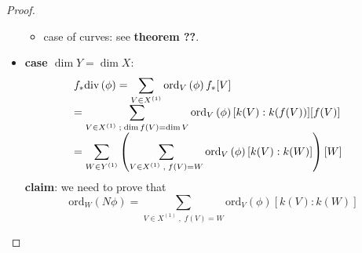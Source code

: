 \documentclass[oneside,a4paper,11pt]{amsbook}
\theoremstyle{pl}
\theoremstyle{df}
\theoremstyle{rm}
\newcommand{\pa}[1]{
\left(#1\right)
}
\newcommand{\ga}[1]{
\left\{#1\right\}
}
\newcommand{\mc}[1]{
\mathcal{#1}
}
\newcommand{\mb}[1]{
\mathbb{#1}
}
\newcommand{\spc}[1]{
\text{Spec }#1
}
\newcommand{\ord}[2]{
\text{ord}_{#1}\pa{#2}
}
\newcommand{\dv}[1]{
\text{div}\pa{#1}
}
\begin{document}
\begin{proof}
\begin{itemize}
{\begin{itemize}
{\[{}
\]
since properness is stable under base change the morph $C\rightarrow\spc k(Y)$ is \emph{proper}, $C=f^{-1}\eta\subseteq X$ (closed emb.) where $\eta\in Y$ is the generic pt. $\dim C=1$ using the \textbf{theorem of the fiber} ($\mc{O}_{Y,\eta}\rightarrow\mc{O}_{X,p}$ is flat for every $p\in f^{-1}\eta$ since everything is flat over a field, \emph{generic flatness})
\[
\dim\mc{O}_{f^{-1}\eta,p}=\dim\mc{O}_{X,p}-\dim\mc{O}_{Y,\eta}=\dim\mc{O}_{X,p}
\]
$C$ is integral: $\eta\in V\subseteq Y$ open affine subset $V=\spc B$, $k(Y)=k(B)=S^{-1}B$ where $S=B-\ga{0}$, $U\subseteq X$ open affine subset $U=\spc A$ with $A$ domain f.g. over $B$, $f^{-1}\eta\cap U=\spc A\otimes_B k(B)=\spc S^{-1}A$, $S^{-1}A$ is a domain.\\
In conclusion $C$ is a proper integral $k(Y)-$curve (possibly singular).
\[
\begin{array}{l l}
\displaystyle f_*\dv{\phi}=f_*\pa{\sum_{V\in X^{(1)}}{\ord{V}{\phi}[V]}} &\\
\displaystyle =\sum_{V\in X^{(1)}}{\ord{V}{\phi}f_*[V]} &\text{by linearity}\\
\displaystyle =\sum_{V\in \pa{f^{-1}\eta}^{(1)}}{\ord{V}{\phi}f_*[V]} &\text{since if $f(V)\neq Y\Rightarrow\dim f(V)<\dim V$}\\
\displaystyle =\pa{\sum_{V\in \pa{f^{-1}\eta}^{(1)}}{\ord{V}{\phi}[k(V):k(Y)]}}[Y] &\\
\displaystyle =\deg(\dv{\phi})[Y]=g_*\dv{\phi}[Y] &\text{once we identify $Z_0\pa{\spc k(Y)}=\mb{Z}$}\\
\end{array}
\]
So it is enough to show that $g_*\dv{\phi}=0$, furthermore we can assume $C$ normal (or equivalently regular) by means of \textbf{proposition ??}.}
\item{case of curves: see \textbf{theorem ??}.}
\end{itemize}
}
\item{\textbf{case $\dim Y=\dim X$}:
\[
\begin{array}{l l}
\displaystyle f_*\dv{\phi}=\sum_{V\in X^{(1)}}{\ord{V}{\phi}f_*[V]} &\\
\displaystyle =\sum_{V\in X^{(1)}\;;\;\dim f(V)=\dim V}{\ord{V}{\phi}[k(V):k(f(V))][f(V)]} &\\
\displaystyle =\sum_{W\in Y^{(1)}}{\pa{\sum_{V\in X^{(1)}\;,\;f(V)=W}{\ord{V}{\phi}[k(V):k(W)]}}[W]} &\\
\end{array}
\]
\textbf{claim}: we need to prove that
\[
\ord{W}{N\phi}=\sum_{V\in X^{(1)}\;,\;f(V)=W}{\ord{V}{\phi}[k(V):k(W)]}
\]}
\end{itemize}
\end{proof}
\end{document}
